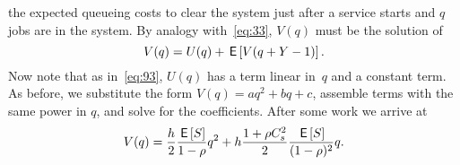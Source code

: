 




 the expected queueing costs to clear the system just after a service starts and  $q$ jobs are in the system.
By analogy with~\cref{eq:33}, $V(q)$ must be the solution of
\begin{equation}  \label{eq:98}
  V(q) = U(q) + \,\mathsf{E}\left[V(q+Y-1)\right].
\end{equation}
Now note that as in~\cref{eq:93}, $U(q)$ has a term linear in~$q$ and a constant term.
As before, we substitute the form $V(q) = aq^2 + bq+c$, assemble terms with the same power in $q$, and solve for the coefficients.
After some work we arrive at
\begin{align*}
  V(q) = \frac{h}{2}\frac{\,\mathsf{E}\left[S\right]}{1-\rho} q^2 + h  \frac{ 1+ \rho C_s^2}2 \frac{\,\mathsf{E}\left[S\right]}{(1-\rho)^2} q.
\end{align*}

